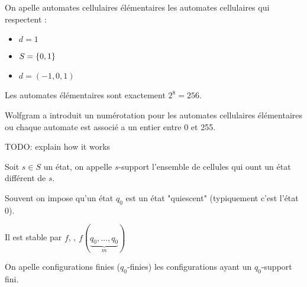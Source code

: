 \begin{definition}

	On apelle automates cellulaires élémentaires les automates cellulaires qui respectent :
	\begin{itemize}
		\item $d = 1$
		\item $S = \left\{0,1\right\}$
		\item $d = (-1,0,1)$
	\end{itemize}

	Les automates élémentaires sont exactement $2^8 = 256$.
\end{definition}

\begin{notation}
	Wolfgram a introduit un numérotation \cite{wolfgramClass} pour les automates cellulaires élémentaires ou chaque automate
	est associé a un entier entre 0 et 255.

	TODO: explain how it works
\end{notation}

\begin{definition}
	Soit $s \in S$ un état, on appelle $s$-support l'ensemble de cellules qui ount
	un état différent de $s$.
\end{definition}

\begin{notation}
	Souvent on impose qu'un état $q_0$ est un état "quiescent" (typiquement c'est l'état 0).

	Il est stable par $f$, \ie, $f(\underbrace{q_0,\ldots, q_0}_m)$
\end{notation}

\begin{definition}
	On apelle configurations finies ($q_0$-finies) les configurations ayant un $q_0$-support fini.
\end{definition}
